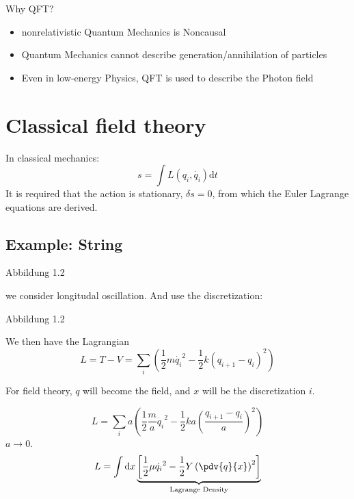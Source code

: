 \documentclass[]{scrartcl}
\title{}
\author{}
\date{\today}
\begin{document}
\maketitle
\newpage
\tableofcontents
\newpage

Why QFT?

\begin{itemize}
	\item nonrelativistic Quantum Mechanics is Noncausal

	\item Quantum Mechanics cannot describe generation/annihilation of particles

	\item Even in low-energy Physics, QFT is used to describe the Photon field
\end{itemize}

\section{Classical field theory}

In classical mechanics:
 \begin{equation}
 	s = \int L(q_i, \dot{q_i}) \text{d}t
 \end{equation}
It is required that the action is stationary, $\delta s = 0$, from which the Euler Lagrange equations are derived.

\subsection{Example: String}

Abbildung 1.2

we consider longitudal oscillation. And use the discretization:

Abbildung 1.2

We then have the Lagrangian
\begin{equation}
	L = T-V = \sum_i \left(\frac{1}{2}m\dot{q_i}^2 - \frac{1}{2} k(q_{i+1} - q_i)^2\right)
\end{equation}

For field theory, $q$ will become the field, and $x$ will be the discretization $i$.

\begin{equation}
	L = \sum_i a\left(\frac{1}{2}\frac{m}{a}\dot{q_i}^2 - \frac{1}{2}ka\left(\frac{q_{i+1} - q_i}{a}\right)^2\right)
\end{equation}
$a\rightarrow 0$.
\begin{equation}
	L = \int \text{d}x \underbrace{\left[\frac{1}{2}\mu \dot{q_i}^2 - \frac{1}{2}Y\left(\pdv{q}{x}\right)^2\right]}_{\text{Lagrange Density}}
\end{equation}
\end{document}
